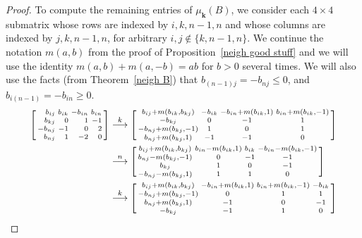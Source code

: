 \documentclass[10pt]{article}
\theoremstyle{definition}
\theoremstyle{remark}
\numberwithin{equation}{section}
\newcommand{\sgn}{\operatorname{sgn}}
\newcommand{\set}[1]{{\lbrace #1 \rbrace}}
\newcommand{\0}{{\mathbf{0}}}
\newcommand{\kk}{{\boldsymbol{k}}}
\begin{document}
\begin{proof}
To compute the remaining entries of $\mu_\kk(B)$, we consider each $4\times4$ submatrix whose rows are indexed by $i,k,n-1,n$ and whose columns are indexed by $j,k,n-1,n$, for arbitrary $i,j\not\in\set{k,n-1,n}$.
We continue the notation $m(a,b)$ from the proof of Proposition~\ref{neigh good stuff} and we will use the identity $m(a,b)+m(a,-b)=ab$ for $b>0$ several times.
We will also use the facts (from Theorem~\ref{neigh B}) that $b_{(n-1)j}=-b_{nj}\le0$, and $b_{i(n-1)}=-b_{in}\ge0$.
\begin{align*}
\begin{bsmallmatrix*}[r]
b_{ij}&b_{ik}&-b_{in}&b_{in}\\
b_{kj}&0&1&-1\\
-b_{nj}&-1&0&2\\
b_{nj}&1&-2&0
\end{bsmallmatrix*}
&\overset{k}{\longrightarrow}
\begin{bsmallmatrix*}
b_{ij}+m(b_{ik},b_{kj}) & -b_{ik} & -b_{in}+m(b_{ik},1) & b_{in}+m(b_{ik},-1)\\
-b_{kj} & 0 & -1 & 1\\
-b_{nj}+m(b_{kj},-1) & 1 & 0 & 1\\
b_{nj}+m(b_{kj},1) & -1 & -1 & 0
\end{bsmallmatrix*}\\
&\overset{n}{\longrightarrow}
\begin{bsmallmatrix*}
b_{ij}+m(b_{ik},b_{kj}) & b_{in}-m(b_{ik},1) & b_{ik} & -b_{in}-m(b_{ik},-1)\\
b_{nj}-m(b_{kj},-1) & 0 & -1 & -1\\
b_{kj} & 1 & 0 & -1\\
-b_{nj}-m(b_{kj},1) & 1 & 1 & 0
\end{bsmallmatrix*}\\
&\overset{k}{\longrightarrow}
\begin{bsmallmatrix*}
b_{ij}+m(b_{ik},b_{kj}) & -b_{in}+m(b_{ik},1) & b_{in}+m(b_{ik},-1) & -b_{ik}\\
-b_{nj}+m(b_{kj},-1) & 0 & 1 & 1\\
b_{nj}+m(b_{kj},1)  & -1 & 0 & -1\\
-b_{kj}& -1 & 1 & 0
\end{bsmallmatrix*}\\

\end{align*}
\end{proof}
\end{document}
